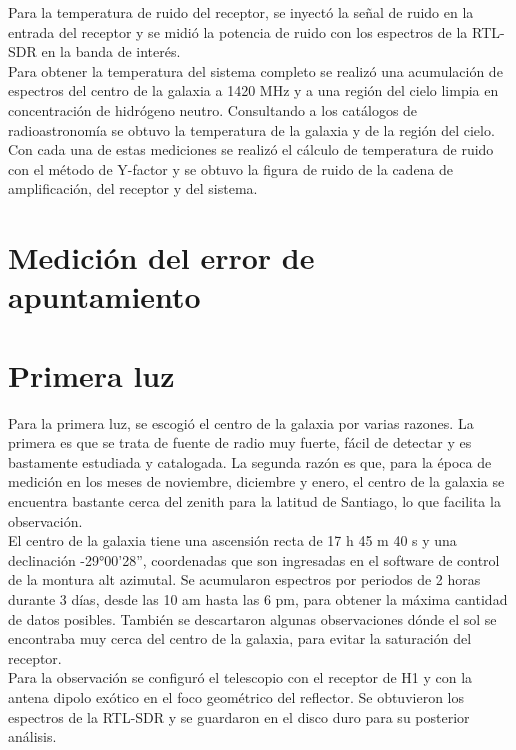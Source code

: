 Para la temperatura de ruido del receptor, se inyectó la señal de ruido en la entrada del receptor y se midió la potencia de ruido con los espectros de la RTL-SDR en la banda de interés.\\

Para obtener la temperatura del sistema completo se realizó una acumulación de espectros del centro de la galaxia a 1420 MHz y a una región del cielo limpia en concentración de hidrógeno neutro. Consultando a los catálogos de radioastronomía se obtuvo la temperatura de la galaxia y de la región del cielo.\\

Con cada una de estas mediciones se realizó el cálculo de temperatura de ruido con el método de Y-factor y se obtuvo la figura de ruido de la cadena de amplificación, del receptor y del sistema.\\


\section{Medición del error de apuntamiento}

\section{Primera luz}

Para la primera luz, se escogió el centro de la galaxia por varias razones. La primera es que se trata de fuente de radio muy fuerte, fácil de detectar y es bastamente estudiada y catalogada. La segunda razón es que, para la época de medición en los meses de noviembre, diciembre y enero, el centro de la galaxia se encuentra bastante cerca del zenith para la latitud de Santiago, lo que facilita la observación.\\

El centro de la galaxia tiene una ascensión recta de 17 h 45 m 40 s y una declinación -29°00'28'', coordenadas que son ingresadas en el software de control de la montura alt azimutal. Se acumularon espectros por periodos de 2 horas durante 3 días, desde las 10 am hasta las 6 pm, para obtener la máxima cantidad de datos posibles. También se descartaron algunas observaciones dónde el sol se encontraba muy cerca del centro de la galaxia, para evitar la saturación del receptor.\\

Para la observación se configuró el telescopio con el receptor de H1 y con la antena dipolo exótico en el foco geométrico del reflector. Se obtuvieron los espectros de la RTL-SDR y se guardaron en el disco duro para su posterior análisis.\\
